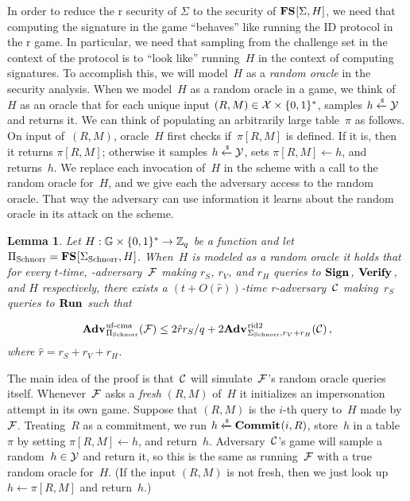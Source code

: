 \documentclass{article}
\newtheorem{lemma}{Lemma}
\theoremstyle{remark}
\begin{document}
In order to reduce the r security of $\Sigma$ to the \ufcma security of
$\textup{\textbf{FS}}\hspace{0.5pt}[\Sigma,H]$, we need that computing the signature in the \ufcma game
``behaves'' like running the ID protocol in the r game.
%
In particular, we need that sampling from the challenge set in the context of
the protocol is to ``look like'' running~$H$ in the context of computing
signatures.
%
To accomplish this, we will model~$H$ as a \emph{random oracle} in the security
analysis.
%
When we model~$H$ as a random oracle in a game, we think of~$H$ as an oracle
that for each unique input $(R,M) \in \mathcal{X}\times\{0,1\}^*$, samples $h\xleftarrow{\text{\tiny{\$}}}\mathcal{Y}$ and
returns it. We can think of populating an arbitrarily large table~$\pi$ as
follows. On input of~$(R,M)$, oracle~$H$ first checks if~$\pi[R,M]$ is defined.
If it is, then it returns $\pi[R,M]$; otherwise it samples $h \xleftarrow{\text{\tiny{\$}}} \mathcal{Y}$, sets
$\pi[R,M]\gets h$, and returns~$h$.
%
We replace each invocation of~$H$ in the scheme with a call to the random oracle
for~$H$, and we give each the adversary access to the random oracle. That way
the adversary can use information it learns about the random oracle in its
attack on the scheme.

\begin{lemma}\label{lemma:rid2->ufcma}
  Let $H:\mathbb{G}\times\{0,1\}^*\to\mathbb{Z}_q$ be a function and let  ${\Pi_{\mathrm{Schnorr}}} =
  \textup{\textbf{FS}}\hspace{0.5pt}[{\Sigma_{\mathrm{Schnorr}}},H]$.
  When~$H$ is modeled as a random oracle it holds that for every $t$-time,
  \ufcma-adversary~$\mathcal{F}$ making $r_S$, $r_V$, and $r_H$ queries to $\textup{\textbf{Sign}}\hspace{0.5pt}$,
  $\textup{\textbf{Verify}}\hspace{0.5pt}$, and $H$ respectively, there exists a $(t+O(\hat{r}))$-time
  r-adversary~$\mathcal{C}$ making~$r_S$ queries to $\textup{\textbf{Run}}\hspace{0.5pt}$ such that

  \begin{equation}
    \Adv{\ufcma}_{\SSchnorr}(\F) \leq
      2\hat{r}r_S/q
      + 2\Adv{r\id2}_{\Schnorr,r_V+r_H}(\C)
    \,,
  \end{equation}
  where $\hat{r}=r_S + r_V + r_H$.
\end{lemma}
\noindent
The main idea of the proof is that~$\mathcal{C}$ will simulate~$\mathcal{F}$'s random oracle
queries itself.  Whenever~$\mathcal{F}$ asks a \emph{fresh} $(R,M)$ of~$H$ it initializes
an impersonation attempt in its own game. Suppose that $(R,M)$ is the $i$-th
query to~$H$ made by~$\mathcal{F}$. Treating~$R$ as a commitment, we run
$h\xleftarrow{\text{\tiny{\$}}}\textup{\textbf{Commit}}\hspace{0.5pt}(i,R)$, store~$h$ in a table~$\pi$ by setting $\pi[R,M]\gets
h$, and return~$h$.  Adversary~$\mathcal{C}$'s game will sample a random~$h\in\mathcal{Y}$ and
return it, so this is the same as running~$\mathcal{F}$ with a true random oracle
for~$H$.  (If the input $(R,M)$ is not fresh, then we just look up $h \gets
\pi[R,M]$ and return~$h$.)
\end{document}
